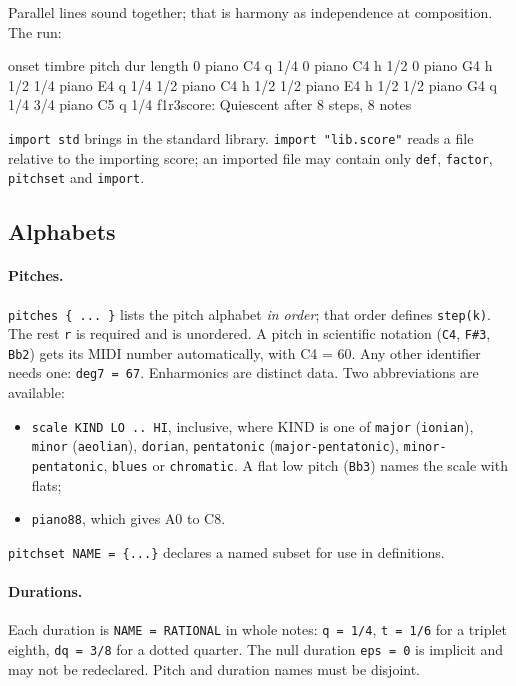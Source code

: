 \documentclass[11pt,a4paper]{article}
\newcommand{\ttx}[1]{\texttt{#1}}
\begin{document}
\noindent Parallel lines sound together; that is harmony as independence at
composition. The run:
\begin{out}
     onset  timbre     pitch  dur     length
         0  piano      C4     q          1/4
         0  piano      C4     h          1/2
         0  piano      G4     h          1/2
       1/4  piano      E4     q          1/4
       1/2  piano      C4     h          1/2
       1/2  piano      E4     h          1/2
       1/2  piano      G4     q          1/4
       3/4  piano      C5     q          1/4
f1r3score: Quiescent after 8 steps, 8 notes
\end{out}

\noindent \ttx{import std} brings in the standard library. \ttx{import
"lib.score"} reads a file relative to the importing score; an imported file may
contain only \ttx{def}, \ttx{factor}, \ttx{pitchset} and \ttx{import}.

\subsection{Alphabets}

\paragraph{Pitches.} \ttx{pitches \{ ... \}} lists the pitch alphabet \emph{in
order}; that order defines \ttx{step(k)}. The rest \ttx{r} is required and is
unordered. A pitch in scientific notation (\ttx{C4}, \ttx{F\#3}, \ttx{Bb2}) gets
its MIDI number automatically, with C4 = 60. Any other identifier needs one:
\ttx{deg7 = 67}. Enharmonics are distinct data. Two abbreviations are
available:
\begin{itemize}
\item \ttx{scale KIND LO .. HI}, inclusive, where KIND is one of \ttx{major}
  (\ttx{ionian}), \ttx{minor} (\ttx{aeolian}), \ttx{dorian}, \ttx{pentatonic}
  (\ttx{major-pentatonic}), \ttx{minor-pentatonic}, \ttx{blues} or
  \ttx{chromatic}. A flat low pitch (\ttx{Bb3}) names the scale with flats;
\item \ttx{piano88}, which gives A0 to C8.
\end{itemize}
\ttx{pitchset NAME = \{...\}} declares a named subset for use in definitions.

\paragraph{Durations.} Each duration is \ttx{NAME = RATIONAL} in whole notes:
\ttx{q = 1/4}, \ttx{t = 1/6} for a triplet eighth, \ttx{dq = 3/8} for a dotted
quarter. The null duration \ttx{eps = 0} is implicit and may not be
redeclared. Pitch and duration names must be disjoint.
\end{document}
